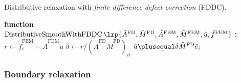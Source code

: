 \begin{algorithm}[htbp]
\caption{Distributive relaxation with \emph{finite difference defect correction} (FDDC).}
\label{alg:ch5.distributive.defectcorrection}
\begin{algorithmic}[1]
\STATE \textbf{function} $\operatorname{DistributiveSmoothWithFDDC} \lrp{\tilde{A}^{\text{FD}}, \tilde{M}^{\text{FD}}, \tilde{A}^{\text{FEM}}, \tilde{M}^{\text{FEM}}, \tilde{u}, \tilde{f}^{\text{FEM}}}$ \textbf{:}
        \STATE $r \leftarrow \tilde{f}^{\text{FEM}}_i - \tilde{A}^{\text{FEM}} \tilde{u}$
        \STATE $\delta \leftarrow r / (\tilde{A}^{\text{FD}} \tilde{M}^{\text{FD}})_{ii}$
        \STATE $\tilde{u} \plusequal \delta \tilde{M}^{\text{FD}} \tilde{e}_i$
    \ENDFOR
\ENDFOR
\end{algorithmic}
\end{algorithm}

\subsubsection{Boundary relaxation}

